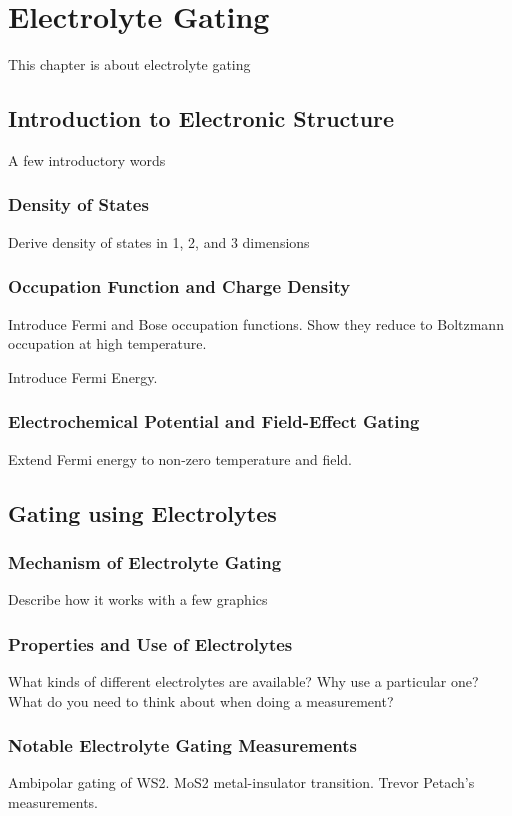 \chapter{Electrolyte Gating}
This chapter is about electrolyte gating

\section{Introduction to Electronic Structure}

A few introductory words

\subsection{Density of States}

Derive density of states in 1, 2, and 3 dimensions

\subsection{Occupation Function and Charge Density}

Introduce Fermi and Bose occupation functions. Show they reduce to Boltzmann occupation at high temperature.

Introduce Fermi Energy.

\subsection{Electrochemical Potential and Field-Effect Gating}

Extend Fermi energy to non-zero temperature and field.

\section{Gating using Electrolytes}

\subsection{Mechanism of Electrolyte Gating}

Describe how it works with a few graphics

\subsection{Properties and Use of Electrolytes}

What kinds of different electrolytes are available? Why use a particular one? What do you need to think about when doing a measurement?

\subsection{Notable Electrolyte Gating Measurements}

Ambipolar gating of WS2. MoS2 metal-insulator transition. Trevor Petach's measurements.